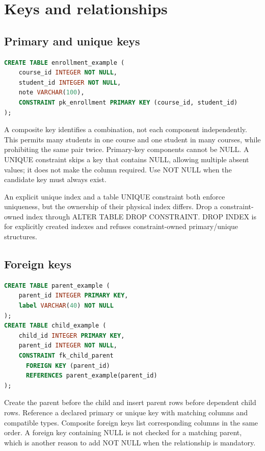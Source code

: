 \section{Keys and relationships}

\subsection{Primary and unique keys}

\begin{lstlisting}[language=SQL]
CREATE TABLE enrollment_example (
    course_id INTEGER NOT NULL,
    student_id INTEGER NOT NULL,
    note VARCHAR(100),
    CONSTRAINT pk_enrollment PRIMARY KEY (course_id, student_id)
);
\end{lstlisting}

A composite key identifies a combination, not each component independently. This permits many students in one course and one student in many courses, while prohibiting the same pair twice. Primary-key components cannot be NULL. A UNIQUE constraint skips a key that contains NULL, allowing multiple absent values; it does not make the column required. Use NOT NULL when the candidate key must always exist.

An explicit unique index and a table UNIQUE constraint both enforce uniqueness, but the ownership of their physical index differs. Drop a constraint-owned index through ALTER TABLE DROP CONSTRAINT. DROP INDEX is for explicitly created indexes and refuses constraint-owned primary/unique structures.

\subsection{Foreign keys}

\begin{lstlisting}[language=SQL]
CREATE TABLE parent_example (
    parent_id INTEGER PRIMARY KEY,
    label VARCHAR(40) NOT NULL
);
CREATE TABLE child_example (
    child_id INTEGER PRIMARY KEY,
    parent_id INTEGER NOT NULL,
    CONSTRAINT fk_child_parent
      FOREIGN KEY (parent_id)
      REFERENCES parent_example(parent_id)
);
\end{lstlisting}

Create the parent before the child and insert parent rows before dependent child rows. Reference a declared primary or unique key with matching columns and compatible types. Composite foreign keys list corresponding columns in the same order. A foreign key containing NULL is not checked for a matching parent, which is another reason to add NOT NULL when the relationship is mandatory.

